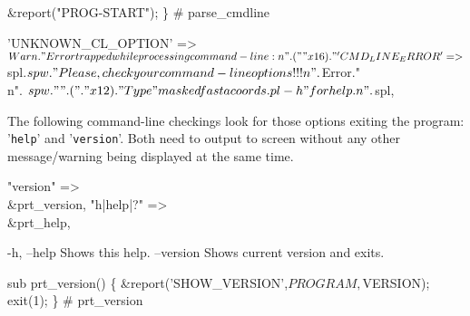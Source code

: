 \documentclass[11pt]{article}
\def\nwendcode{\endtrivlist \endgroup} %
\let\nwdocspar=\par                    %
\begin{document}
    &report("PROG-START");
\} # parse_cmdline
\nwendcode{}\nwdocspar


\nwenddocs{}\endmoddef
'UNKNOWN_CL_OPTION' =>
  $Warn."Error trapped while processing command-line:\\n".(" "x16)."\\%
'CMD_LINE_ERROR' =>
  $spl.$spw." Please, check your command-line options!!!\\n".$Error."\\n".
  $spw." ".("."x12)." Type \\"maskedfastacoords.pl -h\\" for help.\\n".$spl,
\nwendcode{}\nwdocspar


The following command-line checkings look for those options exiting the program: '{\tt{}help}' and '{\tt{}version}'. Both need to output to screen without any other message/warning being displayed at the same time.

\nwenddocs{}\endmoddef
"version"   => \\&prt_version, 
"h|help|?"  => \\&prt_help,
\nwendcode{}\nwdocspar
\nwenddocs{}\endmoddef
-h, --help            Shows this help.
--version             Shows current version and exits.
\nwendcode{}\nwdocspar

\nwenddocs{}\plusendmoddef
sub prt_version() \{
    &report('SHOW_VERSION',$PROGRAM,$VERSION);
    exit(1);
\} # prt_version
\nwendcode{}\nwdocspar
\end{document}

